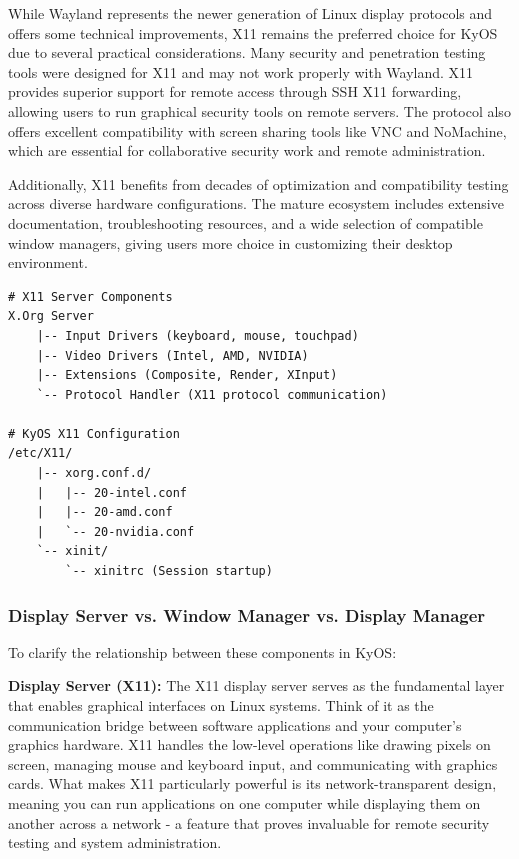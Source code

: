 \documentclass[12pt,a4paper]{article}
\begin{document}
While Wayland represents the newer generation of Linux display protocols and offers some technical improvements, X11 remains the preferred choice for KyOS due to several practical considerations. Many security and penetration testing tools were designed for X11 and may not work properly with Wayland. X11 provides superior support for remote access through SSH X11 forwarding, allowing users to run graphical security tools on remote servers. The protocol also offers excellent compatibility with screen sharing tools like VNC and NoMachine, which are essential for collaborative security work and remote administration.

Additionally, X11 benefits from decades of optimization and compatibility testing across diverse hardware configurations. The mature ecosystem includes extensive documentation, troubleshooting resources, and a wide selection of compatible window managers, giving users more choice in customizing their desktop environment.

\begin{lstlisting}[caption=X11 Architecture Components]
# X11 Server Components
X.Org Server
    |-- Input Drivers (keyboard, mouse, touchpad)
    |-- Video Drivers (Intel, AMD, NVIDIA)
    |-- Extensions (Composite, Render, XInput)
    `-- Protocol Handler (X11 protocol communication)

# KyOS X11 Configuration
/etc/X11/
    |-- xorg.conf.d/
    |   |-- 20-intel.conf
    |   |-- 20-amd.conf
    |   `-- 20-nvidia.conf
    `-- xinit/
        `-- xinitrc (Session startup)
\end{lstlisting}

\subsubsection{Display Server vs. Window Manager vs. Display Manager}

To clarify the relationship between these components in KyOS:

\textbf{Display Server (X11):}
The X11 display server serves as the fundamental layer that enables graphical interfaces on Linux systems. Think of it as the communication bridge between software applications and your computer's graphics hardware. X11 handles the low-level operations like drawing pixels on screen, managing mouse and keyboard input, and communicating with graphics cards. What makes X11 particularly powerful is its network-transparent design, meaning you can run applications on one computer while displaying them on another across a network - a feature that proves invaluable for remote security testing and system administration.
\end{document}
